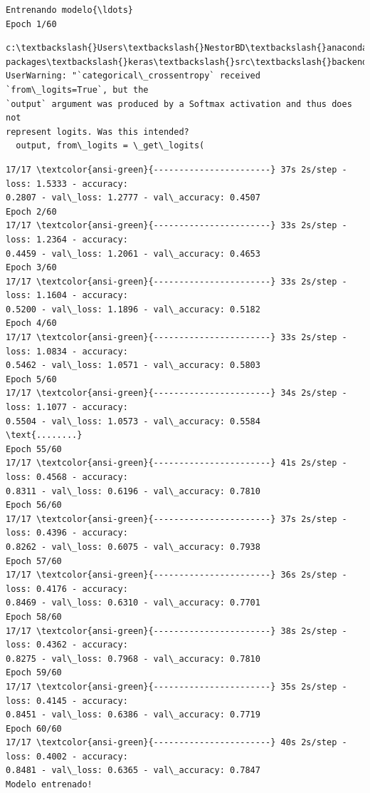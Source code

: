 \documentclass[11pt]{article}
\makeatletter
\newcommand{\boxspacing}{\kern\kvtcb@left@rule\kern\kvtcb@boxsep}
\newcommand{\prompt}[4]{
        {\ttfamily\llap{{\color{#2}[#3]:\hspace{3pt}#4}}\vspace{-\baselineskip}}
    }
\makeatother
\begin{document}
\begin{tcolorbox}[breakable, size=fbox, boxrule=1pt, pad at break*=1mm,colback=cellbackground, colframe=cellborder]
    \prompt{Out}{outcolor}{43}{\boxspacing} 
    \begin{Verbatim}[commandchars=\\\{\}]
Entrenando modelo{\ldots}
Epoch 1/60
    \end{Verbatim}

    \begin{Verbatim}[commandchars=\\\{\}]
c:\textbackslash{}Users\textbackslash{}NestorBD\textbackslash{}anaconda3\textbackslash{}Lib\textbackslash{}site-packages\textbackslash{}keras\textbackslash{}src\textbackslash{}backend.py:5575:
UserWarning: "`categorical\_crossentropy` received `from\_logits=True`, but the
`output` argument was produced by a Softmax activation and thus does not
represent logits. Was this intended?
  output, from\_logits = \_get\_logits(
    \end{Verbatim}

    \begin{Verbatim}[commandchars=\\\{\}]
17/17 \textcolor{ansi-green}{-----------------------} 37s 2s/step - loss: 1.5333 - accuracy:
0.2807 - val\_loss: 1.2777 - val\_accuracy: 0.4507
Epoch 2/60
17/17 \textcolor{ansi-green}{-----------------------} 33s 2s/step - loss: 1.2364 - accuracy:
0.4459 - val\_loss: 1.2061 - val\_accuracy: 0.4653
Epoch 3/60
17/17 \textcolor{ansi-green}{-----------------------} 33s 2s/step - loss: 1.1604 - accuracy:
0.5200 - val\_loss: 1.1896 - val\_accuracy: 0.5182
Epoch 4/60
17/17 \textcolor{ansi-green}{-----------------------} 33s 2s/step - loss: 1.0834 - accuracy:
0.5462 - val\_loss: 1.0571 - val\_accuracy: 0.5803
Epoch 5/60
17/17 \textcolor{ansi-green}{-----------------------} 34s 2s/step - loss: 1.1077 - accuracy:
0.5504 - val\_loss: 1.0573 - val\_accuracy: 0.5584
\text{........}
Epoch 55/60
17/17 \textcolor{ansi-green}{-----------------------} 41s 2s/step - loss: 0.4568 - accuracy:
0.8311 - val\_loss: 0.6196 - val\_accuracy: 0.7810
Epoch 56/60
17/17 \textcolor{ansi-green}{-----------------------} 37s 2s/step - loss: 0.4396 - accuracy:
0.8262 - val\_loss: 0.6075 - val\_accuracy: 0.7938
Epoch 57/60
17/17 \textcolor{ansi-green}{-----------------------} 36s 2s/step - loss: 0.4176 - accuracy:
0.8469 - val\_loss: 0.6310 - val\_accuracy: 0.7701
Epoch 58/60
17/17 \textcolor{ansi-green}{-----------------------} 38s 2s/step - loss: 0.4362 - accuracy:
0.8275 - val\_loss: 0.7968 - val\_accuracy: 0.7810
Epoch 59/60
17/17 \textcolor{ansi-green}{-----------------------} 35s 2s/step - loss: 0.4145 - accuracy:
0.8451 - val\_loss: 0.6386 - val\_accuracy: 0.7719
Epoch 60/60
17/17 \textcolor{ansi-green}{-----------------------} 40s 2s/step - loss: 0.4002 - accuracy:
0.8481 - val\_loss: 0.6365 - val\_accuracy: 0.7847
Modelo entrenado!
    \end{Verbatim}
\end{tcolorbox}
\end{document}
